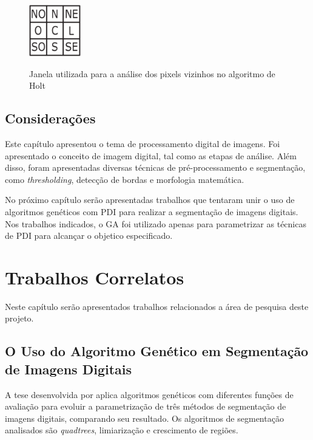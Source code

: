 \documentclass[12pt,oneside,a4paper,english,french,spanish,brazil,]{abntex2}
\begin{document}
\begin{figure}[ht]
\centering
\caption{Janela utilizada para a análise dos pixels vizinhos no algoritmo de Holt}
\includegraphics[width=0.2\textwidth]{imagens/PDI_Holt_1.PNG}
\label{fig:PDI_Holt_1}
\end{figure}

\section{Considerações}

Este capítulo apresentou o tema de processamento digital de imagens. Foi apresentado o conceito de imagem digital, tal como as etapas de análise. Além disso, foram apresentadas diversas técnicas de pré-processamento e segmentação, como \textit{thresholding}, detecção de bordas e morfologia matemática.

No próximo capítulo serão apresentadas trabalhos que tentaram unir o uso de algoritmos genéticos com PDI para realizar a segmentação de imagens digitais. Nos trabalhos indicados, o GA foi utilizado apenas para parametrizar as técnicas de PDI para alcançar o objetico especificado.

\chapter{Trabalhos Correlatos}
\label{chap:TrabalhosCorrelatos}

Neste capítulo serão apresentados trabalhos relacionados a área de pesquisa deste projeto.


\section{O Uso do Algoritmo Genético em Segmentação de Imagens Digitais}

A tese desenvolvida por \citet{matias:2007} aplica algoritmos genéticos com diferentes funções de avaliação para evoluir a parametrização de três métodos de segmentação de imagens digitais, comparando seu resultado. Os algoritmos de segmentação analisados são \textit{quadtrees}, limiarização e crescimento de regiões.
\end{document}
